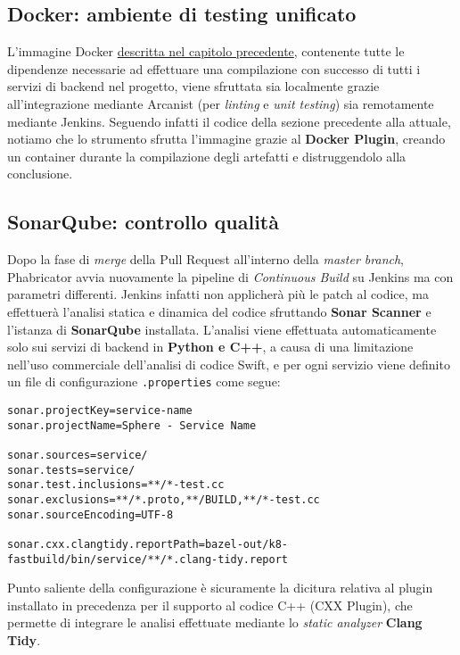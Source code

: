 \documentclass[../main.tex]{subfiles}
\begin{document}
        	\subsection{Docker: ambiente di testing unificato}
        	
        	    L'immagine Docker \hyperref[sec:cloud_arch_docker]{descritta nel capitolo precedente}, contenente tutte le dipendenze necessarie ad effettuare una compilazione con successo di tutti i servizi di backend nel progetto, viene sfruttata sia localmente grazie all'integrazione mediante Arcanist (per \emph{linting} e \emph{unit testing}) sia remotamente mediante Jenkins. Seguendo infatti il codice della sezione precedente alla attuale, notiamo che lo strumento sfrutta l'immagine grazie al \textbf{Docker Plugin}, creando un container durante la compilazione degli artefatti e distruggendolo alla conclusione.
        	
        	\subsection{SonarQube: controllo qualità}
        	
        	    Dopo la fase di \emph{merge} della Pull Request all'interno della \emph{master branch}, Phabricator avvia nuovamente la pipeline di \emph{Continuous Build} su Jenkins ma con parametri differenti. Jenkins infatti non applicherà più le patch al codice, ma effettuerà l'analisi statica e dinamica del codice sfruttando \textbf{Sonar Scanner} e l'istanza di \textbf{SonarQube} installata. L'analisi viene effettuata automaticamente solo sui servizi di backend in \textbf{Python e C++}, a causa di una limitazione nell'uso commerciale dell'analisi di codice Swift, e per ogni servizio viene definito un file di configurazione \verb|.properties| come segue:
        	    \begin{lstlisting}
sonar.projectKey=service-name
sonar.projectName=Sphere - Service Name

sonar.sources=service/
sonar.tests=service/
sonar.test.inclusions=**/*-test.cc
sonar.exclusions=**/*.proto,**/BUILD,**/*-test.cc
sonar.sourceEncoding=UTF-8

sonar.cxx.clangtidy.reportPath=bazel-out/k8-fastbuild/bin/service/**/*.clang-tidy.report
        	    \end{lstlisting}
        	    
        	    Punto saliente della configurazione è sicuramente la dicitura relativa al plugin installato in precedenza per il supporto al codice C++ (CXX Plugin), che permette di integrare le analisi effettuate mediante lo \emph{static analyzer} \textbf{Clang Tidy}.
        	    
\end{document}
